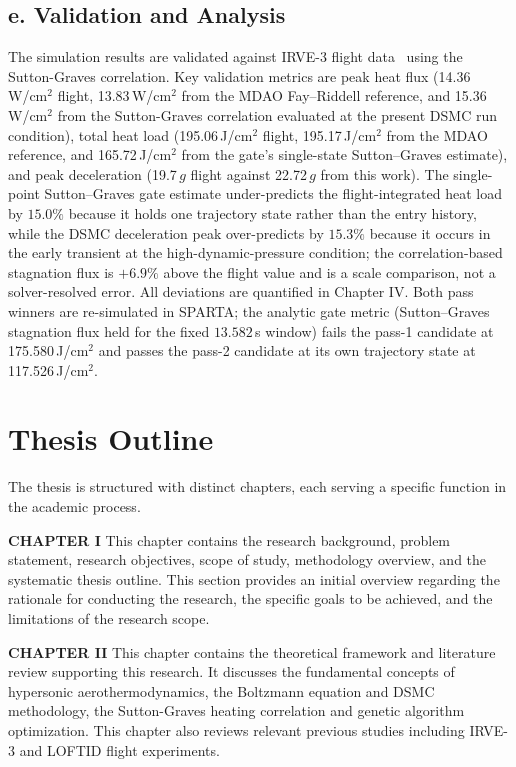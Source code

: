 \subsection*{e. Validation and Analysis}
The simulation results are validated against IRVE-3 flight data~\cite{rapisarda2023mdao} using the Sutton-Graves correlation. Key validation metrics are peak heat flux (14.36\,W/cm$^2$ flight, 13.83\,W/cm$^2$ from the MDAO Fay--Riddell reference, and 15.36\,W/cm$^2$ from the Sutton-Graves correlation evaluated at the present DSMC run condition), total heat load (195.06\,J/cm$^2$ flight, 195.17\,J/cm$^2$ from the MDAO reference, and 165.72\,J/cm$^2$ from the gate's single-state Sutton--Graves estimate), and peak deceleration (19.7\,$g$ flight against 22.72\,$g$ from this work). The single-point Sutton--Graves gate estimate under-predicts the flight-integrated heat load by $15.0\%$ because it holds one trajectory state rather than the entry history, while the DSMC deceleration peak over-predicts by $15.3\%$ because it occurs in the early transient at the high-dynamic-pressure condition; the correlation-based stagnation flux is $+6.9\%$ above the flight value and is a scale comparison, not a solver-resolved error. All deviations are quantified in Chapter IV. Both pass winners are re-simulated in SPARTA; the analytic gate metric (Sutton--Graves stagnation flux held for the fixed $13.582$\,s window) fails the pass-1 candidate at 175.580\,J/cm$^2$ and passes the pass-2 candidate at its own trajectory state at 117.526\,J/cm$^2$.

\section{Thesis Outline}
The thesis is structured with distinct chapters, each serving a specific function in the academic process.

\textbf{CHAPTER I} This chapter contains the research background, problem statement, research objectives, scope of study, methodology overview, and the systematic thesis outline. This section provides an initial overview regarding the rationale for conducting the research, the specific goals to be achieved, and the limitations of the research scope.

\textbf{CHAPTER II} This chapter contains the theoretical framework and literature review supporting this research. It discusses the fundamental concepts of hypersonic aerothermodynamics, the Boltzmann equation and DSMC methodology, the Sutton-Graves heating correlation and genetic algorithm optimization. This chapter also reviews relevant previous studies including IRVE-3 and LOFTID flight experiments.

